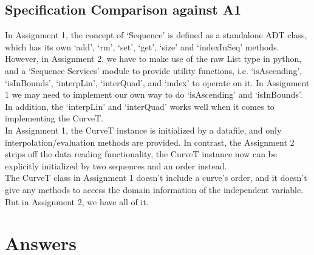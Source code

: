\documentclass[12pt]{article}
\begin{document}
\subsection{Specification Comparison against A1}

In Assignment 1, the concept of ‘Sequence’ is defined as a standalone ADT class, which has its own ‘add’, ‘rm’, ‘set’, ‘get’, ‘size’ and ‘indexInSeq’ methods. However, in Assignment 2, we have to make use of the raw List type in python, and a ‘Sequence Services’ module to provide utility functions, i.e. ‘isAscending’, ‘isInBounds’, ‘interpLin’, ‘interQuad’, and ‘index’ to operate on it. In Assignment 1 we may need to implement our own way to do ‘isAscending’ and ‘isInBounds’. In addition, the ‘interpLin’ and ‘interQuad’  works well when it comes to implementing the CurveT.\\
In Assignment 1, the CurveT instance is initialized by a datafile, and only interpolation/evaluation methods are provided. In contrast, the Assignment 2 strips off the data reading functionality, the CurveT instance now can be explicitly initialized by two sequences and an order instead.\\
The CurveT class in Assignment 1 doesn’t include a curve’s order, and it doesn’t give any methods to access the domain information of the independent variable. But in Assignment 2, we have all of it.\\

\section{Answers}
\end{document}
